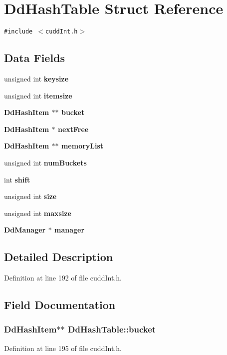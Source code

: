 \section{Dd\-Hash\-Table Struct Reference}
\label{structDdHashTable}
{\tt \#include $<$cudd\-Int.h$>$}

\subsection*{Data Fields}
\begin{CompactItemize}
\item 
unsigned int \bf{keysize}
\item 
unsigned int \bf{itemsize}
\item 
\bf{Dd\-Hash\-Item} $\ast$$\ast$ \bf{bucket}
\item 
\bf{Dd\-Hash\-Item} $\ast$ \bf{next\-Free}
\item 
\bf{Dd\-Hash\-Item} $\ast$$\ast$ \bf{memory\-List}
\item 
unsigned int \bf{num\-Buckets}
\item 
int \bf{shift}
\item 
unsigned int \bf{size}
\item 
unsigned int \bf{maxsize}
\item 
\bf{Dd\-Manager} $\ast$ \bf{manager}
\end{CompactItemize}


\subsection{Detailed Description}




Definition at line 192 of file cudd\-Int.h.

\subsection{Field Documentation}
\subsubsection{\setlength{\rightskip}{0pt plus 5cm}\bf{Dd\-Hash\-Item}$\ast$$\ast$ \bf{Dd\-Hash\-Table::bucket}}\label{structDdHashTable_14e9b750bdad0f77294dd8e18f18d32c}




Definition at line 195 of file cudd\-Int.h.

